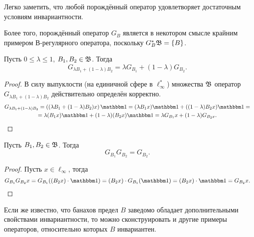 \begin{remark}
	Легко заметить, что любой порождённый оператор удовлетворяет достаточным условиям инвариантности.
\end{remark}

\begin{remark}
	Более того, порождённый оператор $G_B$ является в некотором смысле крайним примером В-регулярного оператора,
	поскольку $G_B^* \mathfrak{B} = \{B\}$.
\end{remark}

\begin{lemma}
	Пусть $0 \leq \lambda \leq 1$, $B_1, B_2 \in \mathfrak{B}$.
	Тогда
	\begin{equation}
		G_{\lambda B_1+(1-\lambda) B_2} =\lambda G_{B_1} + (1-\lambda)G_{B_2}
		.
	\end{equation}
\end{lemma}


\begin{proof}
	В силу выпуклости (на единичной сфере в $\ell_\infty^*$) множества $\mathfrak{B}$ оператор $G_{\lambda B_1+(1-\lambda) B_2}$
	действительно определён корректно.
	\begin{multline}
		G_{\lambda B_1+(1-\lambda) B_2} =
		\left((\lambda B_1+(1-\lambda) B_2) x\right)\mathbbm 1 =
		(\lambda B_1 x) \mathbbm 1 +((1-\lambda) B_2 x)\mathbbm 1 =
		\\=
		\lambda (B_1 x) \mathbbm 1 +(1-\lambda) (B_2 x)\mathbbm 1 =
		\lambda G_{B_1} x +(1-\lambda) G_{B_2 x}
		.
	\end{multline}
\end{proof}


\begin{lemma}
	Пусть $B_1, B_2 \in \mathfrak{B}$.
	Тогда
	\begin{equation}
		G_{B_1} G_{B_2} = G_{B_2}
		.
	\end{equation}
\end{lemma}
\begin{proof}
	Пусть $x\in\ell_\infty$, тогда
	\begin{equation}
		G_{B_1}G_{B_2}x =
		G_{B_1} ( (B_2 x) \cdot \mathbbm 1 ) =
		(B_2 x) \cdot G_{B_1} ( \mathbbm 1 ) =
		(B_2 x) \cdot  \mathbbm 1 =
		G_{B_2}x
		.
	\end{equation}
\end{proof}


Если же известно, что банахов предел $B$ заведомо обладает дополнительными свойствами инвариантности,
то можно сконструировать и другие примеры операторов, относительно которых $B$ инвариантен.

